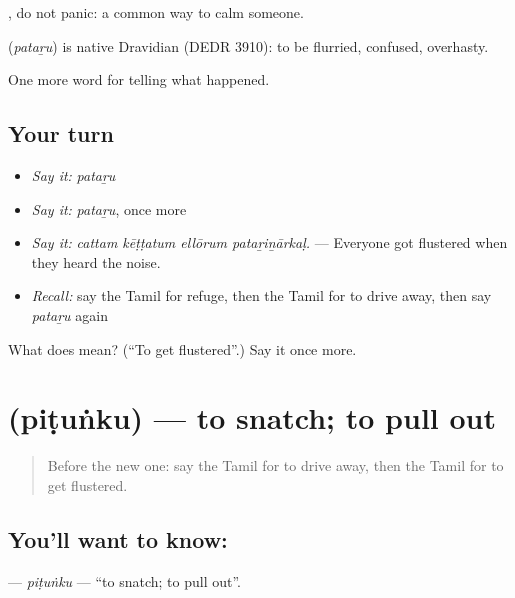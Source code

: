 , do not panic: a common way to calm someone.

\begin{cousinweb}
\textbf{} (\emph{pataṟu}) is native Dravidian (DEDR 3910): to be flurried, confused, overhasty.
\end{cousinweb}

\begin{grammarlens}[title={What you've built}]
One more word for telling what happened.
\end{grammarlens}

\subsection*{Your turn}
\begin{itemize}
\raggedright
  \item \emph{Say it:} \emph{pataṟu}
  \item \emph{Say it:} \emph{pataṟu}, once more
  \item \emph{Say it:} \emph{cattam kēṭṭatum ellōrum pataṟiṉārkaḷ.} — Everyone got flustered when they heard the noise.
  \item \emph{Recall:} say the Tamil for refuge, then the Tamil for to drive away, then say \emph{pataṟu} again
\end{itemize}

\begin{tcolorbox}[breakable,colback=teal!4,colframe=teal!35!black,title={Before you move on}]
What does  mean? (\textquotedblleft{}To get flustered\textquotedblright{}.) Say it once more.
\end{tcolorbox}
\section[\texorpdfstring{\ta{பிடுங்கு} (piṭuṅku)}{பிடுங்கு (piṭuṅku)}]{ (piṭuṅku) — to snatch; to pull out}

\label{lesson:TA-C304-pitunku}



\begin{quote}
Before the new one: say the Tamil for to drive away, then the Tamil for to get flustered.
\end{quote}

\subsection*{You'll want to know: }
\textbf{} — \emph{piṭuṅku} — \textquotedblleft{}to snatch; to pull out\textquotedblright{}.

